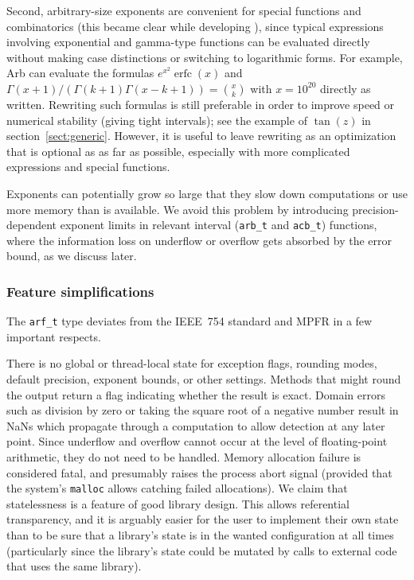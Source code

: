 \documentclass[10pt,journal,compsoc,cspaper]{IEEEtran}
\begin{document}
Second, arbitrary-size exponents are convenient for special
functions and combinatorics
(this became clear while developing \cite{mpmath}),
since typical expressions involving exponential and gamma-type functions
can be evaluated directly without making
case distinctions or switching to logarithmic forms.
For example, Arb can evaluate the formulas $e^{x^2} \operatorname{erfc}(x)$
and $\Gamma(x+1) / (\Gamma(k+1) \Gamma(x-k+1)) = {x \choose k}$
with $x = 10^{20}$ directly as written.
Rewriting such formulas is still preferable in order to
improve speed or numerical stability (giving tight intervals);
see the example of $\tan(z)$ in section~\ref{sect:generic}.
However, it is useful to leave rewriting as an optimization that is optional as
as far as possible, especially with more
complicated expressions and special functions.

Exponents can potentially grow so large that they slow down
computations or use more memory than is available.
We avoid this problem by introducing precision-dependent
exponent limits in relevant interval (\texttt{arb\_t} and \texttt{acb\_t}) functions,
where the information loss on underflow or overflow
gets absorbed by the error bound, as we discuss later.

\subsubsection{Feature simplifications}

The \texttt{arf\_t} type deviates from the IEEE~754 standard and
MPFR in a few important respects.

There is no global or thread-local state for exception flags,
rounding modes, default precision, exponent bounds, or other settings.
Methods that might round the output return a flag indicating whether the result is exact.
Domain errors such as division by zero or taking the square root
of a negative number result in NaNs which propagate through
a computation to allow detection at any later point.
Since underflow and overflow cannot occur at the level of floating-point
arithmetic, they do not need to be handled.
Memory allocation failure is considered fatal, and presumably
raises the process abort signal (provided that the system's \texttt{malloc}
allows catching failed allocations).
We claim that statelessness is a feature of good library design.
This allows referential transparency, and
it is arguably easier for the user to implement their own state than to be sure
that a library's state is in the wanted configuration at all times
(particularly since the library's state could be mutated by calls to external code
that uses the same library).
\end{document}
